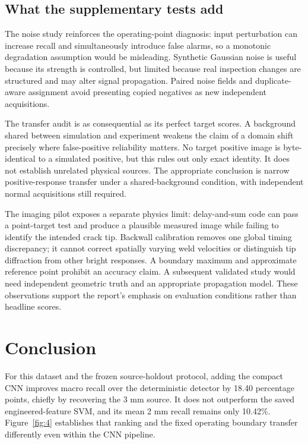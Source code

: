 \documentclass[11pt,a4paper]{article}
\begin{document}
\subsection{What the supplementary tests add}

The noise study reinforces the operating-point diagnosis: input perturbation can increase recall and simultaneously introduce false alarms, so a monotonic degradation assumption would be misleading. Synthetic Gaussian noise is useful because its strength is controlled, but limited because real inspection changes are structured and may alter signal propagation. Paired noise fields and duplicate-aware assignment avoid presenting copied negatives as new independent acquisitions.

The transfer audit is as consequential as its perfect target scores. A background shared between simulation and experiment weakens the claim of a domain shift precisely where false-positive reliability matters. No target positive image is byte-identical to a simulated positive, but this rules out only exact identity. It does not establish unrelated physical sources. The appropriate conclusion is narrow positive-response transfer under a shared-background condition, with independent normal acquisitions still required.

The imaging pilot exposes a separate physics limit: delay-and-sum code can pass a point-target test and produce a plausible measured image while failing to identify the intended crack tip. Backwall calibration removes one global timing discrepancy; it cannot correct spatially varying weld velocities or distinguish tip diffraction from other bright responses. A boundary maximum and approximate reference point prohibit an accuracy claim. A subsequent validated study would need independent geometric truth and an appropriate propagation model. These observations support the report's emphasis on evaluation conditions rather than headline scores.

\FloatBarrier
\section{Conclusion}

For this dataset and the frozen source-holdout protocol, adding the compact CNN improves macro recall over the deterministic detector by 18.40 percentage points, chiefly by recovering the 3 mm source. It does not outperform the saved engineered-feature SVM, and its mean 2 mm recall remains only 10.42\%. Figure~\ref{fig:4} establishes that ranking and the fixed operating boundary transfer differently even within the CNN pipeline.
\end{document}
